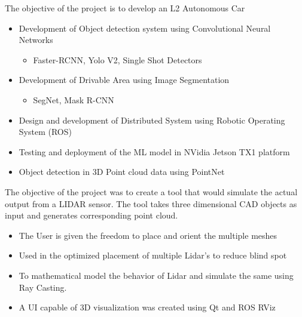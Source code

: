 \documentclass[10pt,a4paper,ragged2e,withhyper]{altacv}
\begin{document}
            The objective of the project is to develop an L2 Autonomous Car
            \linebreak
            \begin{itemize}
                \item Development of Object detection system using Convolutional Neural Networks
                    \begin{itemize}
                        \item Faster-RCNN, Yolo V2, Single Shot Detectors
                    \end{itemize}
                \item Development of Drivable Area using Image Segmentation
                    \begin{itemize}
                        \item SegNet, Mask R-CNN
                    \end{itemize}
                \item Design and development of Distributed System using Robotic Operating System (ROS)
                \item Testing and deployment of the ML model in NVidia Jetson TX1 platform
                \item Object detection in 3D Point cloud data using PointNet
            \end{itemize}
            \divider

            The objective of the project was to create a tool that would simulate the actual output from a LIDAR sensor. The tool takes three dimensional CAD objects as input and generates corresponding point cloud.
            \linebreak
            \begin{itemize}
                \item The User is given the freedom to place and orient the multiple meshes
                \item Used in the optimized placement of multiple Lidar's to reduce blind spot
                \item To mathematical model the behavior of Lidar and simulate the same using Ray Casting.
                \item A UI capable of 3D visualization was created using Qt and ROS RViz
            \end{itemize}
            \divider
\end{document}
